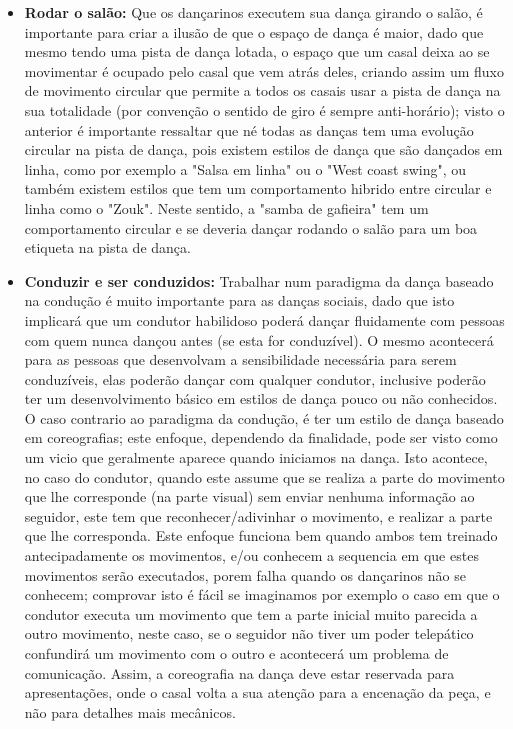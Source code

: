 \begin{itemize}
\item \textbf{Rodar o salão:} Que os dançarinos executem sua dança girando o salão, 
é importante para criar a ilusão de que o espaço de dança é maior, dado que mesmo
tendo uma pista de dança lotada, o espaço que um
casal deixa ao se movimentar é ocupado pelo casal que vem atrás deles, criando 
assim um fluxo de movimento circular que permite a todos os casais usar a pista de dança
na sua totalidade (por convenção o sentido de giro é sempre anti-horário); 
visto o anterior é importante ressaltar que né todas as danças tem
uma evolução circular na pista de dança, pois existem estilos de dança que são dançados em linha,
como por exemplo a "Salsa em linha" ou o "West coast swing", ou também existem estilos que
tem um comportamento hibrido entre circular e linha como o "Zouk". Neste sentido,
a "samba de gafieira"  tem um comportamento circular e se deveria dançar
rodando o salão para um boa etiqueta na pista de dança.
\item \textbf{Conduzir e ser conduzidos:} Trabalhar num paradigma da dança baseado
na condução é muito importante para as danças sociais, dado que isto implicará
que um condutor habilidoso poderá dançar fluidamente com pessoas com quem nunca dançou
antes (se esta for conduzível). O mesmo acontecerá para as pessoas que desenvolvam
a sensibilidade necessária para serem conduzíveis, elas poderão dançar com qualquer
condutor, inclusive poderão ter um desenvolvimento básico em estilos de dança pouco ou não conhecidos.
O caso contrario ao paradigma da condução, é ter um estilo de dança baseado em coreografias;
este enfoque, dependendo da finalidade, pode ser visto como um vicio que geralmente aparece quando iniciamos
na dança. Isto acontece, no caso do condutor, quando este assume que se realiza a parte do movimento 
que lhe corresponde (na parte visual) sem enviar nenhuma informação ao seguidor, 
este tem que reconhecer/adivinhar o movimento, e realizar a parte que lhe corresponda. Este enfoque
funciona bem quando ambos tem treinado antecipadamente os movimentos, e/ou conhecem a sequencia
em que estes movimentos serão executados, porem falha quando os dançarinos não se conhecem;
comprovar isto é fácil se imaginamos por exemplo o caso em que o condutor executa um movimento
que tem a parte inicial muito parecida a outro movimento, neste caso, se o seguidor não tiver
um poder telepático confundirá um movimento com o outro e acontecerá um problema de comunicação. Assim, a coreografia
na dança deve estar reservada para apresentações, onde o casal volta 
a sua atenção para a encenação da peça, e não para detalhes mais mecânicos.


\end{itemize}
